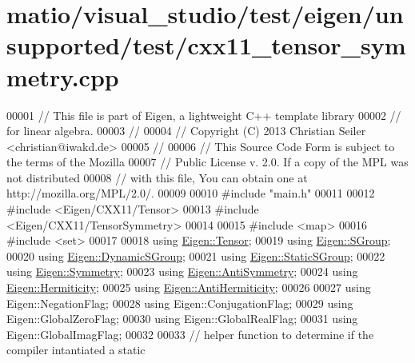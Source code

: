\hypertarget{matio_2visual__studio_2test_2eigen_2unsupported_2test_2cxx11__tensor__symmetry_8cpp_source}{}\section{matio/visual\+\_\+studio/test/eigen/unsupported/test/cxx11\+\_\+tensor\+\_\+symmetry.cpp}
\label{matio_2visual__studio_2test_2eigen_2unsupported_2test_2cxx11__tensor__symmetry_8cpp_source}

\begin{DoxyCode}
00001 \textcolor{comment}{// This file is part of Eigen, a lightweight C++ template library}
00002 \textcolor{comment}{// for linear algebra.}
00003 \textcolor{comment}{//}
00004 \textcolor{comment}{// Copyright (C) 2013 Christian Seiler <christian@iwakd.de>}
00005 \textcolor{comment}{//}
00006 \textcolor{comment}{// This Source Code Form is subject to the terms of the Mozilla}
00007 \textcolor{comment}{// Public License v. 2.0. If a copy of the MPL was not distributed}
00008 \textcolor{comment}{// with this file, You can obtain one at http://mozilla.org/MPL/2.0/.}
00009 
00010 \textcolor{preprocessor}{#include "main.h"}
00011 
00012 \textcolor{preprocessor}{#include <Eigen/CXX11/Tensor>}
00013 \textcolor{preprocessor}{#include <Eigen/CXX11/TensorSymmetry>}
00014 
00015 \textcolor{preprocessor}{#include <map>}
00016 \textcolor{preprocessor}{#include <set>}
00017 
00018 \textcolor{keyword}{using} \hyperlink{class_eigen_1_1_tensor}{Eigen::Tensor};
00019 \textcolor{keyword}{using} \hyperlink{class_eigen_1_1_s_group}{Eigen::SGroup};
00020 \textcolor{keyword}{using} \hyperlink{class_eigen_1_1_dynamic_s_group}{Eigen::DynamicSGroup};
00021 \textcolor{keyword}{using} \hyperlink{class_eigen_1_1_static_s_group}{Eigen::StaticSGroup};
00022 \textcolor{keyword}{using} \hyperlink{struct_eigen_1_1_symmetry}{Eigen::Symmetry};
00023 \textcolor{keyword}{using} \hyperlink{struct_eigen_1_1_anti_symmetry}{Eigen::AntiSymmetry};
00024 \textcolor{keyword}{using} \hyperlink{struct_eigen_1_1_hermiticity}{Eigen::Hermiticity};
00025 \textcolor{keyword}{using} \hyperlink{struct_eigen_1_1_anti_hermiticity}{Eigen::AntiHermiticity};
00026 
00027 \textcolor{keyword}{using} Eigen::NegationFlag;
00028 \textcolor{keyword}{using} Eigen::ConjugationFlag;
00029 \textcolor{keyword}{using} Eigen::GlobalZeroFlag;
00030 \textcolor{keyword}{using} Eigen::GlobalRealFlag;
00031 \textcolor{keyword}{using} Eigen::GlobalImagFlag;
00032 
00033 \textcolor{comment}{// helper function to determine if the compiler intantiated a static}

\end{DoxyCode}
